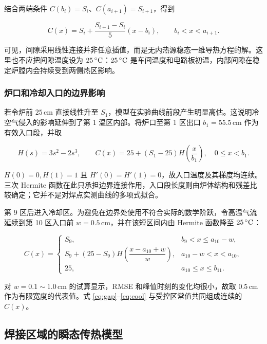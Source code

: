 结合两端条件 $C(b_i)=S_i$、$C(a_{i+1})=S_{i+1}$，得到

\begin{equation}
  C(x)=S_i+\frac{S_{i+1}-S_i}{5}(x-b_i),
  \qquad b_i<x<a_{i+1}.
  \label{eq:gap}
\end{equation}

可见，间隙采用线性连接并非任意插值，而是无内热源稳态一维导热方程的解。这里也不应把间隙温度设为 $25\,^{\circ}\mathrm{C}$：$25\,^{\circ}\mathrm{C}$ 是车间温度和电路板初温，内部间隙在稳定炉膛内会持续受到两侧热区影响。

\subsubsection{炉口和冷却入口的边界影响}

若令炉前 $25\,$cm 直接线性升至 $S_1$，模型在实验曲线前段产生明显高估。这说明冷空气侵入的影响延伸到了第 1 温区内部。将炉口至第 1 区出口 $b_1=55.5\,$cm 作为有效入口段，并取

\begin{equation}
  H(s)=3s^2-2s^3,\qquad
  C(x)=25+(S_1-25)H\!\left(\frac{x}{b_1}\right),
  \quad 0\le x<b_1.
  \label{eq:front}
\end{equation}

$H(0)=0,H(1)=1$ 且 $H'(0)=H'(1)=0$，故入口温度及其梯度均连续。三次 Hermite 函数在此只承担边界连接作用，入口段长度则由炉体结构和残差比较确定；它并不是对焊点实测曲线的多项式拟合。

第 9 区后进入冷却区。为避免在边界处使用不符合实际的数学阶跃，令高温气流延续到第 10 区入口前 $w=0.5\,$cm，并在该短区间内由 Hermite 函数降至 $25\,^{\circ}\mathrm{C}$：

\begin{equation}
  C(x)=
  \begin{cases}
    S_9, & b_9<x\le a_{10}-w,\\
    S_9+(25-S_9)H\!\left(\dfrac{x-a_{10}+w}{w}\right),
      &a_{10}-w<x<a_{10},\\
    25, &a_{10}\le x\le b_{11}.
  \end{cases}
  \label{eq:cool}
\end{equation}

对 $w=0.1\sim1.0\,$cm 的试算显示，RMSE 和峰值时刻的变化均很小，故取 $0.5\,$cm 作为有限宽度的代表值。式 \eqref{eq:gap}--\eqref{eq:cool} 与受控区常值共同组成连续的 $C(x)$。

\subsection{焊接区域的瞬态传热模型}

